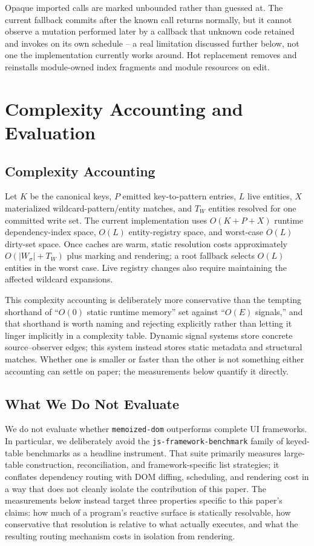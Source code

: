 \documentclass[conference]{IEEEtran}
\begin{document}
Opaque imported calls are marked unbounded rather than guessed at. The
current fallback commits after the known call returns normally, but it
cannot observe a mutation performed later by a callback that unknown code
retained and invokes on its own schedule -- a real limitation discussed
further below, not one the implementation currently works around. Hot
replacement removes and reinstalls module-owned index fragments and module
resources on edit.

\section{Complexity Accounting and Evaluation}
\label{sec:evaluation}

\subsection{Complexity Accounting}

Let $K$ be the canonical keys, $P$ emitted key-to-pattern entries, $L$ live
entities, $X$ materialized wildcard-pattern/entity matches, and $T_W$
entities resolved for one committed write set. The current implementation
uses $O(K+P+X)$ runtime dependency-index space, $O(L)$ entity-registry space,
and worst-case $O(L)$ dirty-set space. Once caches are warm, static
resolution costs approximately $O(|W_\sigma|+T_W)$ plus marking and
rendering; a root fallback selects $O(L)$ entities in the worst case. Live
registry changes also require maintaining the affected wildcard expansions.

This complexity accounting is deliberately more conservative than the
tempting shorthand of ``$O(0)$ static runtime memory'' set against ``$O(E)$
signals,'' and that shorthand is worth naming and rejecting explicitly rather
than letting it linger implicitly in a complexity table. Dynamic signal
systems store concrete source--observer edges; this system instead stores
static metadata and structural matches. Whether one is smaller or faster than
the other is not something either accounting can settle on paper; the
measurements below quantify it directly.

\subsection{What We Do Not Evaluate}

We do not evaluate whether \texttt{memoized-dom} outperforms complete UI
frameworks. In particular, we deliberately avoid the
\texttt{js-framework-benchmark} family of keyed-table benchmarks
\cite{js-framework-benchmark} as a headline instrument. That suite primarily
measures large-table construction, reconciliation, and framework-specific
list strategies; it conflates dependency routing with DOM diffing,
scheduling, and rendering cost in a way that does not cleanly isolate the
contribution of this paper. The measurements below instead target three
properties specific to this paper's claims: how much of a program's reactive
surface is statically resolvable, how conservative that resolution is
relative to what actually executes, and what the resulting routing mechanism
costs in isolation from rendering.
\end{document}
